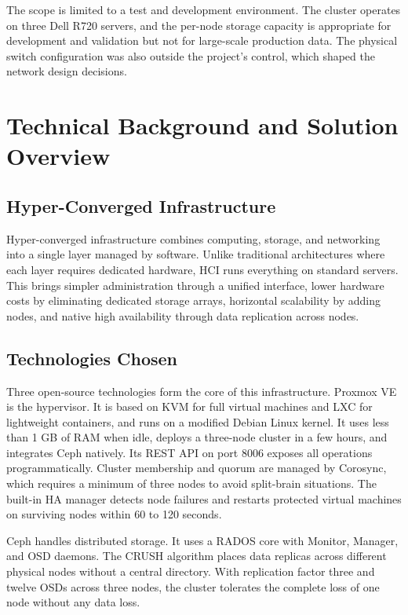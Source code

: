 \documentclass[12pt, a4paper]{article}
\begin{document}
The scope is limited to a test and development environment. The cluster operates on three Dell R720 servers, and the per-node storage capacity is appropriate for development and validation but not for large-scale production data. The physical switch configuration was also outside the project's control, which shaped the network design decisions.

\section{Technical Background and Solution Overview}

\subsection{Hyper-Converged Infrastructure}

Hyper-converged infrastructure combines computing, storage, and networking into a single layer managed by software. Unlike traditional architectures where each layer requires dedicated hardware, HCI runs everything on standard servers. This brings simpler administration through a unified interface, lower hardware costs by eliminating dedicated storage arrays, horizontal scalability by adding nodes, and native high availability through data replication across nodes.

\subsection{Technologies Chosen}

Three open-source technologies form the core of this infrastructure. Proxmox VE is the hypervisor. It is based on KVM for full virtual machines and LXC for lightweight containers, and runs on a modified Debian Linux kernel. It uses less than 1 GB of RAM when idle, deploys a three-node cluster in a few hours, and integrates Ceph natively. Its REST API on port 8006 exposes all operations programmatically. Cluster membership and quorum are managed by Corosync, which requires a minimum of three nodes to avoid split-brain situations. The built-in HA manager detects node failures and restarts protected virtual machines on surviving nodes within 60 to 120 seconds.

Ceph handles distributed storage. It uses a RADOS core with Monitor, Manager, and OSD daemons. The CRUSH algorithm places data replicas across different physical nodes without a central directory. With replication factor three and twelve OSDs across three nodes, the cluster tolerates the complete loss of one node without any data loss.
\end{document}
